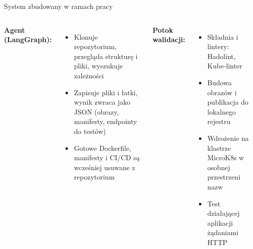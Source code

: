\documentclass[aspectratio=169]{beamer}
\begin{document}
\begin{frame}{System zbudowany w ramach pracy}
    \centering
    \vspace{0.5em}
    \begin{columns}[T]
        \raggedright
        \textbf{Agent (LangGraph):}
        {\small
        \begin{itemize}
            \item Klonuje repozytorium, przegląda strukturę i pliki, wyszukuje zależności
            \item Zapisuje pliki i łatki, wynik zwraca jako JSON (obrazy, manifesty, endpointy do testów)
            \item Gotowe Dockerfile, manifesty i CI/CD są wcześniej usuwane z repozytorium
        \end{itemize}}
        \raggedright
        \textbf{Potok walidacji:}
        {\small
        \begin{itemize}
            \item Składnia i lintery: Hadolint, Kube-linter
            \item Budowa obrazów i publikacja do lokalnego rejestru
            \item Wdrożenie na klastrze MicroK8s w osobnej przestrzeni nazw
            \item Test działającej aplikacji żądaniami HTTP
        \end{itemize}}
    \end{columns}
\end{frame}
\end{document}
